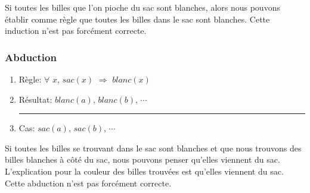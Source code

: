 Si toutes les billes que l'on pioche du sac sont blanches, alors nous pouvons établir comme règle que toutes les billes dans le sac sont blanches. Cette induction n'est pas forcément correcte.

\subsubsection{Abduction}

\begin{enumerate}
  \item Règle: $\forall$ $x$, $sac(x)$ $\Rightarrow$ $blanc(x)$
  \item Résultat: $blanc(a)$, $blanc(b)$, $\cdots$\\
  \rule{5.5cm}{.1pt}
  \item Cas: $sac(a)$, $sac(b)$, $\cdots$
\end{enumerate}

Si toutes les billes se trouvant dans le sac sont blanches et que nous trouvons des billes blanches à côté du sac, nous pouvons penser qu'elles viennent du sac.
L'explication pour la couleur des billes trouvées est qu'elles viennent du sac.
Cette abduction n'est pas forcément correcte.
